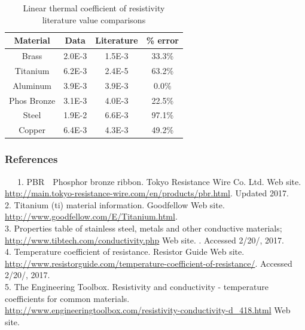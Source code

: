 \documentclass[11pt]{article}
\begin{document}
\begin{table}[h]
	\centering
	\begin{tabular}{||c|c|c|c||}
	\hline
	Material & Data & Literature & \% error\\
	\hline
	\hline
	Brass & 2.0E-3 & 1.5E-3 & 33.3\%\\
	\hline
	Titanium & 6.2E-3 & 2.4E-5 & 63.2\%\\
	\hline
	Aluminum & 3.9E-3 & 3.9E-3 & 0.0\%\\
	\hline
	Phos Bronze & 3.1E-3 & 4.0E-3 & 22.5\%\\
	\hline
	Steel & 1.9E-2 & 6.6E-3 & 97.1\%\\
	\hline
	Copper & 6.4E-3 & 4.3E-3 & 49.2\%\\
	\hline
	\end{tabular}
	\caption{Linear thermal coefficient of resistivity literature value comparisons}
\end{table}

\subsubsection*{References}

\ \ \ 1. PBR　Phosphor bronze ribbon. Tokyo Resistance Wire Co. Ltd. Web site. \url{http://main.tokyo-resistance-wire.com/en/products/pbr.html}. Updated 2017.\\

2. Titanium (ti) material information. Goodfellow Web site. \url{http://www.goodfellow.com/E/Titanium.html}.\\

3. Properties table of stainless steel, metals and other conductive materials; \url{http://www.tibtech.com/conductivity.php} Web site. . Accessed 2/20/, 2017.\\

4. Temperature coefficient of resistance. Resistor Guide Web site. \url{http://www.resistorguide.com/temperature-coefficient-of-resistance/}. Accessed 2/20/, 2017.\\

5. The Engineering Toolbox. Resistivity and conductivity - temperature coefficients for common materials. \url{http://www.engineeringtoolbox.com/resistivity-conductivity-d_418.html} Web site.
\end{document}
